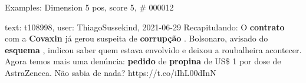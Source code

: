 \begin{frame}{Examples: Dimension 5 pos, score 5, \# 000012}
\footnotesize
\begin{exampleblock}{text: t108998, user: ThiagoSussekind, 2021-06-29}
Recapitulando: O \textbf{contrato} com a \textbf{Covaxin} já gerou suspeita de 
\textbf{corrupção} . Bolsonaro, avisado do \textbf{esquema} , indicou saber 
quem estava envolvido e deixou a roubalheira acontecer. Agora temos mais uma 
denúncia: \textbf{pedido} de \textbf{propina} de US\$ 1 por dose de 
AstraZeneca. Não sabia de nada? https://t.co/iIhL00dInN 
\end{exampleblock}
\end{frame}

